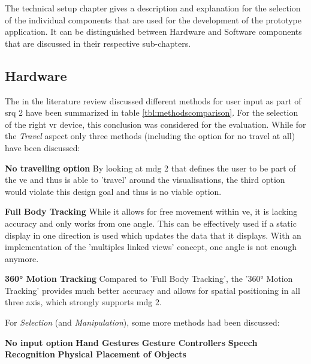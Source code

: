 The technical setup chapter gives a description and explanation for the selection of the individual components that are used for the development of the prototype application. It can be distinguished between Hardware and Software components that are discussed in their respective sub-chapters.


\subsection{Hardware}

The in the literature review discussed different methods for user input as part of \gls{srq} 2 have been summarized in table \ref{tbl:methodscomparison}. For the selection of the right \gls{vr} device, this conclusion was considered for the evaluation. While for the \textit{Travel} aspect only three methods (including the option for no travel at all) have been discussed:

\textbf{No travelling option} \newline
By looking at \gls{mdg} 2 that defines the user to be part of the \gls{ve} and thus is able to 'travel' around the visualisations, the third option would violate this design goal and thus is no viable option.

\textbf{Full Body Tracking} \newline
While it allows for free movement within \gls{ve}, it is lacking accuracy and only works from one angle. This can be effectively used if a static display in one direction is used which updates the data that it displays. With an implementation of the 'multiples linked views' concept, one angle is not enough anymore.

\textbf{360° Motion Tracking} \newline
Compared to 'Full Body Tracking', the '360° Motion Tracking' provides much better accuracy and allows for spatial positioning in all three axis, which strongly supports \gls{mdg} 2.



For \textit{Selection} (and \textit{Manipulation}), some more methods had been discussed:

\textbf{No input option} \newline
\textbf{Hand Gestures} \newline
\textbf{Gesture Controllers} \newline
\textbf{Speech Recognition} \newline
\textbf{Physical Placement of Objects} \newline


